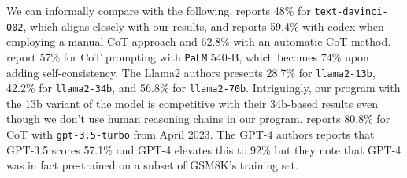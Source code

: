 We can informally compare with the following.
\citet{zhang2022automatic} reports 48\% for \texttt{text-davinci-002}, which aligns closely with our \llamaThirteenChat{} results, and reports 59.4\% with codex when employing a manual CoT approach and 62.8\% with an automatic CoT method.
\citet{wang2022self} report 57\% for CoT prompting with \texttt{PaLM} 540-B, which becomes 74\% upon adding self-consistency. The Llama2 authors \citep{touvron2023llama} presents 28.7\% for \texttt{llama2-13b}, 42.2\% for \texttt{llama2-34b}, and 56.8\% for \texttt{llama2-70b}.
Intriguingly, our program with the 13b variant of the model is competitive with their 34b-based results even though we don't use human reasoning chains in our program.
\citet{zhao2023automatic} reports 80.8\% for CoT with \texttt{gpt-3.5-turbo} from April 2023.
The GPT-4 authors \citep{openai2023gpt4} reports that {GPT-3.5} scores 57.1\% and GPT-4 elevates this to 92\% but they note that {GPT-4} was in fact pre-trained on a subset of GSM8K's training set.



















































































